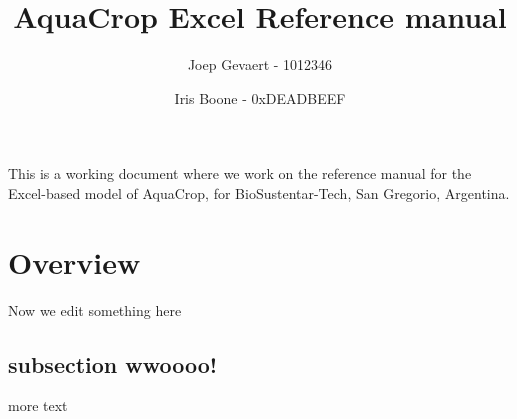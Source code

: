 \documentclass{article}
\title{AquaCrop Excel Reference manual}
\author[1]{Joep Gevaert - 1012346}
\author[2]{Iris Boone - 0xDEADBEEF}
\begin{document}
\maketitle
This is a working document where we work on the reference manual for the
Excel-based model of AquaCrop, for BioSustentar-Tech, San Gregorio, Argentina.
\section{Overview}
Now we edit something here
\subsection{subsection wwoooo!}
more text
\end{document}
